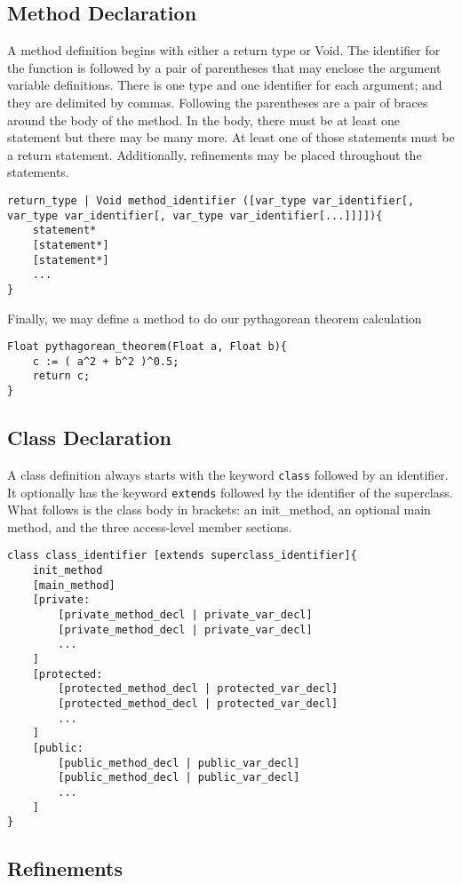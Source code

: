 \subsection{Method Declaration}
A method definition begins with either a return type or Void. The identifier for the function is followed by a pair of parentheses that may enclose the argument variable definitions. There is one type and one identifier for each argument; and they are delimited by commas. Following the parentheses are a pair of braces around the body of the method. In the body, there must be at least one statement but there may be many more. At least one of those statements must be a return statement. Additionally, refinements may be placed throughout the statements.
 
\begin{lstlisting}
return_type | Void method_identifier ([var_type var_identifier[, var_type var_identifier[, var_type var_identifier[...]]]]){
	statement*
	[statement*]
	[statement*]
	...
}
\end{lstlisting}

Finally, we may define a method to do our pythagorean theorem calculation

\begin{lstlisting}[label=Method Invocation,caption=Method Definition for the Pythagorean Theorem]
Float pythagorean_theorem(Float a, Float b){
	c := ( a^2 + b^2 )^0.5;
	return c;
}
\end{lstlisting}

\subsection{Class Declaration}
A class definition always starts with the keyword \verb!class! followed by an identifier. It optionally has the keyword \verb!extends! followed by the identifier of the superclass. What follows is the class body in brackets: an init\_method, an optional main method, and the three access-level member sections.

\begin{lstlisting}
class class_identifier [extends superclass_identifier]{
	init_method
	[main_method]
	[private:
		[private_method_decl | private_var_decl]
		[private_method_decl | private_var_decl]
		...
	]
	[protected:
		[protected_method_decl | protected_var_decl]
		[protected_method_decl | protected_var_decl]
		...
	]
	[public:
		[public_method_decl | public_var_decl]
		[public_method_decl | public_var_decl]
		...
	]
}
\end{lstlisting}


\subsection{Refinements}